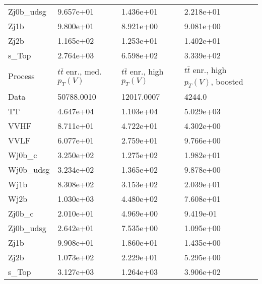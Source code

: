 \begin{table}
{\begin{tabularx}{0.8\textwidth}{|X|X|X|X|}
Zj0b\_udsg & 9.657e+01 & 1.436e+01 & 2.218e+01 \\
Zj1b & 9.800e+01 & 8.921e+00 & 9.081e+00 \\
Zj2b & 1.165e+02 & 1.253e+01 & 1.402e+01 \\
s\_Top & 2.764e+03 & 6.598e+02 & 3.339e+02 \\
\hline
\hline
Process & $t\bar{t}$ enr., med. $p_{T}(V)$ & $t\bar{t}$ enr., high $p_{T}(V)$ & $t\bar{t}$ enr., high $p_{T}(V)$, boosted \\
\hline
Data & 50788.0010 & 12017.0007 & 4244.0 \\
\hline
TT & 4.647e+04 & 1.103e+04 & 5.029e+03 \\
VVHF & 8.711e+01 & 4.722e+01 & 4.302e+00 \\
VVLF & 6.077e+01 & 2.759e+01 & 9.766e+00 \\
Wj0b\_c & 3.250e+02 & 1.275e+02 & 1.982e+01 \\
Wj0b\_udsg & 3.234e+02 & 1.365e+02 & 9.878e+00 \\
Wj1b & 8.308e+02 & 3.153e+02 & 2.039e+01 \\
Wj2b & 1.030e+03 & 4.480e+02 & 7.608e+01 \\
Zj0b\_c & 2.010e+01 & 4.969e+00 & 9.419e-01 \\
Zj0b\_udsg & 2.642e+01 & 7.535e+00 & 1.095e+00 \\
Zj1b & 9.908e+01 & 1.860e+01 & 1.435e+00 \\
Zj2b & 1.073e+02 & 2.229e+01 & 5.295e+00 \\
s\_Top & 3.127e+03 & 1.264e+03 & 3.906e+02 \\
\hline
\end{tabularx}
}
\label{tab:cr-Wmn-2016}
\end{table}

